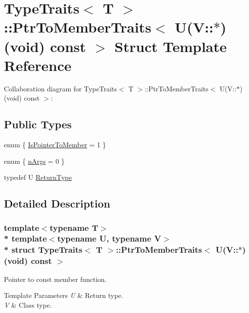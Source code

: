 \hypertarget{structTypeTraits_1_1PtrToMemberTraits_3_01U_07V_1_1_5_08_07void_08_01const_01_01_4}{}\section{Type\+Traits$<$ T $>$\+:\+:Ptr\+To\+Member\+Traits$<$ U(V\+:\+:$\ast$)(void) const $>$ Struct Template Reference}
\label{structTypeTraits_1_1PtrToMemberTraits_3_01U_07V_1_1_5_08_07void_08_01const_01_01_4}


Collaboration diagram for Type\+Traits$<$ T $>$\+:\+:Ptr\+To\+Member\+Traits$<$ U(V\+:\+:$\ast$)(void) const $>$\+:
\subsection*{Public Types}
\begin{DoxyCompactItemize}
\item 
enum \{ \hyperlink{structTypeTraits_1_1PtrToMemberTraits_3_01U_07V_1_1_5_08_07void_08_01const_01_01_4_a7d52bf1a56c79d867a3c686df58b08b2a37aeb7c74ec4b01354e9e1740c244a01}{Is\+Pointer\+To\+Member} = 1
 \}
\item 
enum \{ \hyperlink{structTypeTraits_1_1PtrToMemberTraits_3_01U_07V_1_1_5_08_07void_08_01const_01_01_4_a8dc54398f3d37adcc90194d306397278a9b0973dd3356f1279a1c27d341b7a62a}{n\+Args} = 0
 \}
\item 
typedef U \hyperlink{structTypeTraits_1_1PtrToMemberTraits_3_01U_07V_1_1_5_08_07void_08_01const_01_01_4_a01055d8df7fd507d0124dd7489d489b0}{Return\+Type}
\end{DoxyCompactItemize}


\subsection{Detailed Description}
\subsubsection*{template$<$typename T$>$\\*
template$<$typename U, typename V$>$\\*
struct Type\+Traits$<$ T $>$\+::\+Ptr\+To\+Member\+Traits$<$ U(\+V\+::$\ast$)(void) const  $>$}

Pointer to const member function. 
\begin{DoxyTemplParams}{Template Parameters}
{\em U} & Return type. \\
\hline
{\em V} & Class type. \\
\hline
\end{DoxyTemplParams}


